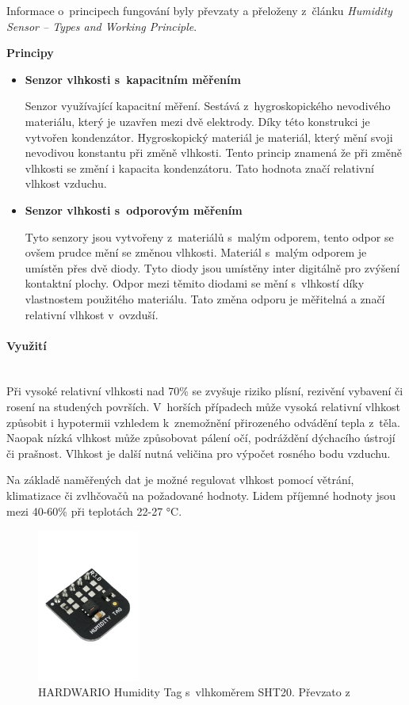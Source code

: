 Informace o~principech fungování byly převzaty a přeloženy z~článku \emph{Humidity Sensor – Types and Working Principle}\cite{humidity-sensor-description}.

\noindent\textbf{Principy}
\begin{itemize}
  \item \textbf{Senzor vlhkosti s~kapacitním měřením} 
  
  Senzor využívající kapacitní měření. Sestává z~hygroskopického nevodivého materiálu, který je uzavřen mezi dvě elektrody. Díky této konstrukci je vytvořen kondenzátor. Hygroskopický materiál je materiál, který mění svoji nevodivou konstantu při změně vlhkosti. Tento princip znamená že při změně vlhkosti se změní i kapacita kondenzátoru. Tato hodnota značí relativní vlhkost vzduchu.
  \item \textbf{Senzor vlhkosti s~odporovým měřením}
  
  Tyto senzory jsou vytvořeny z~materiálů s~malým odporem, tento odpor se ovšem prudce mění se změnou vlhkosti. Materiál s~malým odporem je umístěn přes dvě diody. Tyto diody jsou umístěny inter digitálně pro zvýšení kontaktní plochy. Odpor mezi těmito diodami se mění s~vlhkostí díky vlastnostem použitého materiálu. Tato změna odporu je měřitelná a značí relativní vlhkost v~ovzduší.
  \end{itemize}

\paragraph*{Využití}\mbox{} \\
Při vysoké relativní vlhkosti nad 70\% se zvyšuje riziko plísní, rezivění vybavení či rosení na studených površích. V~horších případech může vysoká relativní vlhkost způsobit i hypotermii vzhledem k~znemožnění přirozeného odvádění tepla z~těla. Naopak nízká vlhkost může způsobovat pálení očí, podráždění dýchacího ústrojí či prašnost. Vlhkost je další nutná veličina pro výpočet rosného bodu vzduchu.

Na základě naměřených dat je možné regulovat vlhkost pomocí větrání, klimatizace či zvlhčovačů na požadované hodnoty. Lidem příjemné hodnoty jsou mezi 40-60\% při teplotách 22-27 °C.

\begin{figure}[H]
  \centering
  \includegraphics[width=0.3\textwidth]{obrazky-figures/hardwareComponents/humidityTag.jpg}
  \caption{HARDWARIO Humidity Tag s~vlhkoměrem SHT20. Převzato z~\cite{hardwario-module-overview}}
  \label{hardwarioHumidityTag}
\end{figure}

